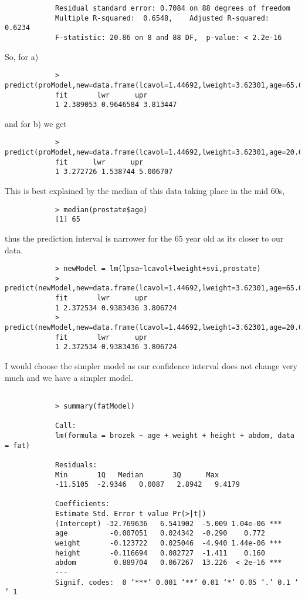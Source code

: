 \documentclass[12pt]{article}
\begin{document}
\begin{enumerate}
\begin{verbatim}
			Residual standard error: 0.7084 on 88 degrees of freedom
			Multiple R-squared:  0.6548,	Adjusted R-squared:  0.6234 
			F-statistic: 20.86 on 8 and 88 DF,  p-value: < 2.2e-16
		\end{verbatim}
		So, for a) 
		\begin{verbatim}
			> predict(proModel,new=data.frame(lcavol=1.44692,lweight=3.62301,age=65.00,lbph=0.30010,svi=0.0,lcp=-0.79851,gleason=7.0,pgg45=15),interval="prediction")
			fit       lwr      upr
			1 2.389053 0.9646584 3.813447
		\end{verbatim}
		and for b) we get
		\begin{verbatim}
			> predict(proModel,new=data.frame(lcavol=1.44692,lweight=3.62301,age=20.00,lbph=0.30010,svi=0.0,lcp=-0.79851,gleason=7.0,pgg45=15),interval="prediction")
			fit      lwr      upr
			1 3.272726 1.538744 5.006707
		\end{verbatim}
		This is best explained by the median of this data taking place in the mid 60s,
		\begin{verbatim}
			> median(prostate$age)
			[1] 65
		\end{verbatim}
		thus the prediction interval is narrower for the 65 year old as its closer to our data.
		\begin{verbatim}
			> newModel = lm(lpsa~lcavol+lweight+svi,prostate)
			> predict(newModel,new=data.frame(lcavol=1.44692,lweight=3.62301,age=65.00,lbph=0.30010,svi=0.0,lcp=-0.79851,gleason=7.0,pgg45=15),interval="prediction")
			fit       lwr      upr
			1 2.372534 0.9383436 3.806724
			> predict(newModel,new=data.frame(lcavol=1.44692,lweight=3.62301,age=20.00,lbph=0.30010,svi=0.0,lcp=-0.79851,gleason=7.0,pgg45=15),interval="prediction")
			fit       lwr      upr
			1 2.372534 0.9383436 3.806724
		\end{verbatim}
		I would choose the simpler model as our confidence interval does not change very much and we have a simpler model.
		\begin{verbatim}
			
			> summary(fatModel)
			
			Call:
			lm(formula = brozek ~ age + weight + height + abdom, data = fat)
			
			Residuals:
			Min       1Q   Median       3Q      Max 
			-11.5105  -2.9346   0.0087   2.8942   9.4179 
			
			Coefficients:
			Estimate Std. Error t value Pr(>|t|)    
			(Intercept) -32.769636   6.541902  -5.009 1.04e-06 ***
			age          -0.007051   0.024342  -0.290    0.772    
			weight       -0.123722   0.025046  -4.940 1.44e-06 ***
			height       -0.116694   0.082727  -1.411    0.160    
			abdom         0.889704   0.067267  13.226  < 2e-16 ***
			---
			Signif. codes:  0 ‘***’ 0.001 ‘**’ 0.01 ‘*’ 0.05 ‘.’ 0.1 ‘ ’ 1
			

\end{verbatim}
\end{enumerate}
\end{document}
